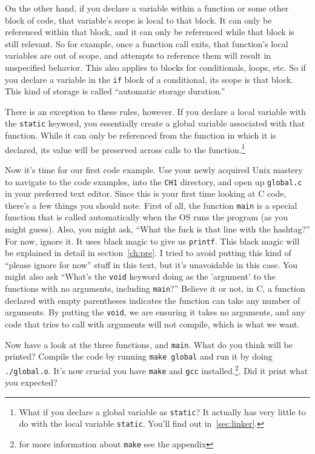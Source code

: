 \documentclass[ebook,11pt,oneside,openany]{memoir}
\newcommand{\cf}[1]{\texttt{#1}}
\begin{document}
On the other hand, if you declare a variable within a function or some other block of code, that variable's scope is local to that block. It can only be referenced within that block, and it can only be referenced while that block is still relevant. So for example, once a function call exits, that function's local variables are out of scope, and attempts to reference them will result in unspecified behavior. This also applies to blocks for conditionals, loops, etc. So if you declare a variable in the \cf{if} block of a conditional, its scope is that block. This kind of storage is called ``automatic storage duration.''

There is an exception to these rules, however. If you declare a local variable with the \cf{static} keyword, you essentially create a global variable associated with that function. While it can only be referenced from the function in which it is declared, its value will be preserved across calls to the function.\footnote{What if you declare a global variable as \cf{static}? It actually has very little to do with the local variable \cf{static}. You'll find out in~\ref{sec:linker}.}

Now it's time for our first code example. Use your newly acquired Unix mastery to navigate to the code examples, into the \cf{CH1} directory, and open up \cf{global.c} in your preferred text editor. Since this is your first time looking at C code, there's a few things you should note. First of all, the function \cf{main} is a special function that is called automatically when the OS runs the program (as you might guess). Also, you might ask, ``What the fuck is that line with the hashtag?'' For now, ignore it. It uses black magic to give us \texttt{printf}. This black magic will be explained in detail in section~\ref{ch:pre}. I tried to avoid putting this kind of ``please ignore for now'' stuff in this text, but it's unavoidable in this case. You might also ask ``What's the \texttt{void} keyword doing as the 'argument' to the functions with no arguments, including \cf{main}?'' Believe it or not, in C, a function declared with empty parentheses indicates the function can take any number of arguments. By putting the \texttt{void}, we are ensuring it takes no arguments, and any code that tries to call with arguments will not compile, which is what we want.

Now have a look at the three functions, and \cf{main}. What do you think will be printed? Compile the code by running \cf{make global} and run it by doing \cf{./global.o}. It's now crucial you have \cf{make} and \cf{gcc} installed.\footnote{for more information about \cf{make} see the appendix}. Did it print what you expected?
\end{document}
